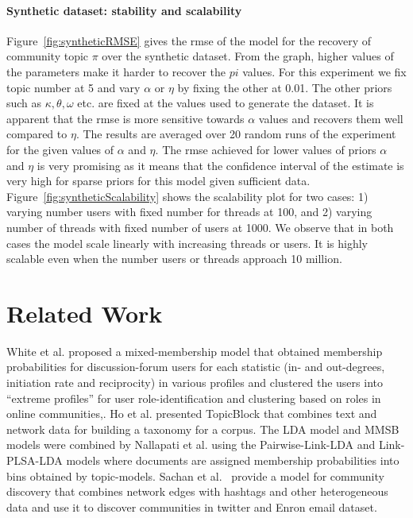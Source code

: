 \documentclass{sig-alternate}
\newcommand{\abhi}[1]{\textcolor{blue}{\\ abhi-comment: #1}}
\begin{document}
\paragraph{Synthetic dataset: stability and scalability}
Figure~\ref{fig:syntheticRMSE} gives the rmse of the model for the recovery of
community topic $\pi$ over the synthetic dataset. From the graph, higher values
of the parameters make it harder to recover the $pi$ values. For this experiment
we fix topic number at 5 and vary $\alpha$ or $\eta$ by fixing the other at
0.01. The other priors such as $\kappa, \theta,
\omega$ etc. are fixed at the values used to generate the dataset.  
It is apparent that the rmse is more sensitive towards $\alpha$ values and
recovers them well compared to $\eta$. The results are averaged over 20 random
runs of the experiment for the given values of $\alpha$ and $\eta$. The rmse
achieved for lower values of priors $\alpha$ and $\eta$ is very promising as
it means that the confidence interval of the estimate is very high for sparse
priors for this model given sufficient data. 
Figure~\ref{fig:syntheticScalability} shows the scalability plot for two cases:
1) varying number users with fixed number for threads at 100, and 2) varying number of 
threads with fixed number of users at 1000. We observe that in both cases 
the model scale linearly with increasing threads or users. It is highly scalable 
even when the number users or threads approach 10 million. 


\section{Related Work}

White et al.\cite{ICWSM124638} proposed a mixed-membership model that obtained
membership probabilities for discussion-forum users for each statistic
(in- and out-degrees, initiation rate and reciprocity) in various profiles and
clustered the users into ``extreme profiles'' for user role-identification
and clustering based on roles in online communities,. Ho et al.
\cite{Ho:2012:DHT:2187836.2187936} presented TopicBlock that combines text and
network data for building a taxonomy for a corpus.
The LDA model and MMSB models were combined by
Nallapati et al. \cite{Nallapati:2008:JLT:1401890.1401957} using the
Pairwise-Link-LDA and Link-PLSA-LDA models where documents are assigned
membership probabilities into bins obtained by topic-models. Sachan et
al.~\cite{Sachan:2012:UCI:2187836.2187882} provide a model for community
discovery that combines network edges with hashtags and other heterogeneous data
and use it to discover communities in twitter and Enron email dataset.
\end{document}

